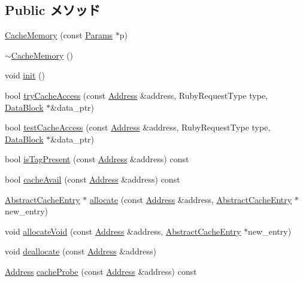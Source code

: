 \subsection*{Public メソッド}
\begin{DoxyCompactItemize}
\item 
\hyperlink{classCacheMemory_a6d47aa204a76f4d2c72e64478e365f80}{CacheMemory} (const \hyperlink{classCacheMemory_ae5279e63669c110c0bd87dca490f126d}{Params} $\ast$p)
\item 
\hyperlink{classCacheMemory_a331251b11e8dca3018962c8209d79385}{$\sim$CacheMemory} ()
\item 
void \hyperlink{classCacheMemory_a02fd73d861ef2e4aabb38c0c9ff82947}{init} ()
\item 
bool \hyperlink{classCacheMemory_acfc92479973bfd11ae0191fd798ba44c}{tryCacheAccess} (const \hyperlink{classAddress}{Address} \&address, RubyRequestType type, \hyperlink{classDataBlock}{DataBlock} $\ast$\&data\_\-ptr)
\item 
bool \hyperlink{classCacheMemory_aba82772b79ad7b17d20d195979043473}{testCacheAccess} (const \hyperlink{classAddress}{Address} \&address, RubyRequestType type, \hyperlink{classDataBlock}{DataBlock} $\ast$\&data\_\-ptr)
\item 
bool \hyperlink{classCacheMemory_a38231bf6d0b58d2b0319faa5af3135ca}{isTagPresent} (const \hyperlink{classAddress}{Address} \&address) const 
\item 
bool \hyperlink{classCacheMemory_add6ef1702fc19966e797bbebabf3cefa}{cacheAvail} (const \hyperlink{classAddress}{Address} \&address) const 
\item 
\hyperlink{classAbstractCacheEntry}{AbstractCacheEntry} $\ast$ \hyperlink{classCacheMemory_a3318e163b565401bb192c21040097d88}{allocate} (const \hyperlink{classAddress}{Address} \&address, \hyperlink{classAbstractCacheEntry}{AbstractCacheEntry} $\ast$new\_\-entry)
\item 
void \hyperlink{classCacheMemory_a97904b9885a944606b8d74fe48fa427a}{allocateVoid} (const \hyperlink{classAddress}{Address} \&address, \hyperlink{classAbstractCacheEntry}{AbstractCacheEntry} $\ast$new\_\-entry)
\item 
void \hyperlink{classCacheMemory_ad1a3e4943cc214363839148c7d94d6a4}{deallocate} (const \hyperlink{classAddress}{Address} \&address)
\item 
\hyperlink{classAddress}{Address} \hyperlink{classCacheMemory_ab7017a4e3b3db35ecd4f778ec0f61cdf}{cacheProbe} (const \hyperlink{classAddress}{Address} \&address) const 
\item 

\end{DoxyCompactItemize}
